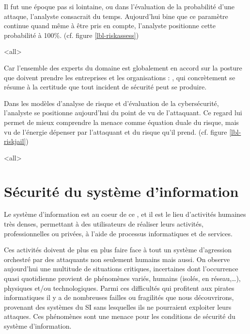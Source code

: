 
Il fut une époque pas si lointaine, ou dans l'évaluation de la probabilité d'une attaque, l'analyste consacrait du temps. Aujourd'hui bine que ce paramètre continue quand même à être pris en compte, l'analyste positionne cette probabilité à 100\%.  (cf. figure \ref{lbl-riskassess})



\mode<all>{}

 Car l'ensemble des experts du domaine est globalement en accord sur la posture que doivent prendre les entreprises et les organisations : , qui concrètement se résume à la certitude que tout incident de sécurité peut se produire.
 
Dans les modèles d'analyse de risque et d'évaluation de la cybersécurité, l'analyste se positionne aujourd'hui du point de vu de l'attaquant. Ce regard lui permet de mieux comprendre la menace comme équation duale du risque, mais vu de l'énergie dépenser par l'attaquant et du risque qu'il prend. (cf. figure \ref{lbl-riskjail})



\mode<all>{}


\section{Sécurité du système d'information}

Le système d'information est au coeur de ce , et il est le lieu d'activités humaines très denses, permettant à des utilisateurs de réaliser leurs activités, professionnelles ou privées, à l'aide de processus informatiques et de services. 

Ces activités doivent de plus en plus faire face à tout un système d'agression orchestré par des attaquants non seulement humains mais aussi. On observe aujourd'hui une multitude de situations critiques, incertaines dont l'occurrence quasi quotidienne provient de phénomènes variés, humains (isolés, en réseau,…), physiques et/ou technologiques. Parmi ces difficultés qui profitent aux pirates informatiques il y a de nombreuses failles ou fragilités que nous découvrirons, provenant des systèmes du SI sans lesquelles ils ne pourraient exploiter leurs attaques. Ces phénomènes sont une menace pour les conditions de sécurité du système d'information.

